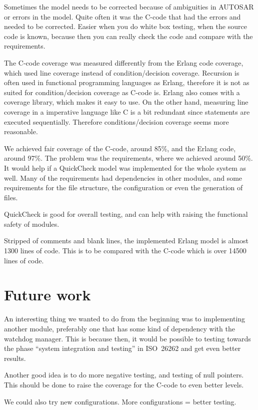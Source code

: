 Sometimes the model needs to be corrected because of ambiguities in
AUTOSAR or errors in the model. Quite often it was the C-code that had
the errors and needed to be corrected.  Easier when you do white box
testing, when the source code is known, because then you can really
check the code and compare with the requirements.

The C-code coverage was measured differently from the Erlang code
coverage, which used line coverage instead of condition/decision
coverage. Recursion is often used in functional programming languages
as Erlang, therefore it is not as suited for condition/decision
coverage as C-code is. Erlang also comes with a coverage library,
which makes it easy to use. On the other hand, measuring line coverage
in a imperative language like C is a bit redundant since statements
are executed sequentially. Therefore conditions/decision coverage
seems more reasonable.

We achieved fair coverage of the C-code, around 85\%, and the Erlang
code, around 97\%. The problem was the requirements, where we achieved
around 50\%. It would help if a QuickCheck model was implemented for
the whole system as well. Many of the requirements had dependencies in
other modules, and some requirements for the file structure, the
configuration or even the generation of files.

QuickCheck is good for overall testing, and can help with raising the
functional safety of modules.


Stripped of comments and blank lines, the implemented Erlang model is
almost 1300 lines of code. This is to be compared with the C-code
which is over 14500 lines of code.


\section{Future work}
An interesting thing we wanted to do from the beginning was to implementing
another module, preferably one that has some kind of dependency with the
watchdog manager. This is because then, it would be possible to testing towards
the phase ``system integration and testing'' in ISO~26262 and get even better
results.

Another good idea is to do more negative testing, and testing of null
pointers. This should be done to raise the coverage for the C-code to even
better levels.

We could also try new configurations. More configurations = better testing.
